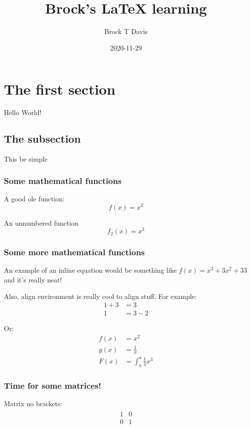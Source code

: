 \documentclass{article}
\title{Brock's LaTeX learning}
\date{2020-11-29}
\author{Brock T Davis}
\begin{document}
  \maketitle
  \newpage


  \section{The first section}
    Hello World!

  \subsection{The subsection}
    This be simple

  \subsubsection{Some mathematical functions}
    A good ole function:
    \begin{equation}
      f(x) = x^2
    \end{equation}

    An unnumbered function
    \begin{equation*}
      f_2(x) = x^3
    \end{equation*}

  \subsubsection{Some more mathematical functions}
    An example of an inline equation would be something like $f(x) = x ^3 + 3x^2 + 33$ and it's really neat!

    \noindent
    Also, align environment is really cool to align stuff.
    For example:
    \begin{align*}
      1 + 3 &= 3 \\
      1 &= 3 - 2
    \end{align*}

    \noindent
    Or:
    \begin{align*}
      f(x) &= x^2 \\
      g(x) &= \frac{1}{x} \\
      F(x) &= \int^a_b \frac{1}{3}x^3
    \end{align*}

  \subsubsection{Time for some matrices!}
    Matrix no brackets:
    \begin{align*}
    \begin{matrix}
      1 & 0 \\
      0 & 1
    \end{matrix}
    \end{align*}
\end{document}
